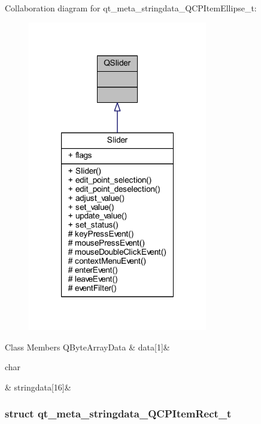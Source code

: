 Collaboration diagram for qt\+\_\+meta\+\_\+stringdata\+\_\+\+Q\+C\+P\+Item\+Ellipse\+\_\+t\+:
\nopagebreak
\begin{figure}[H]
\begin{center}
\leavevmode
\includegraphics[width=222pt]{d9/d0d/a00298}
\end{center}
\end{figure}
\begin{DoxyFields}{Class Members}
\hypertarget{a00067_a7efd0687e2b0fbd2c4df25855b74af30}{Q\+Byte\+Array\+Data}\label{a00067_a7efd0687e2b0fbd2c4df25855b74af30}
&
data\mbox{[}1\mbox{]}&
\\
\hline

\hypertarget{a00067_a35ee014e43cf9f75fa027534df3b222d}{char}\label{a00067_a35ee014e43cf9f75fa027534df3b222d}
&
stringdata\mbox{[}16\mbox{]}&
\\
\hline

\end{DoxyFields}
\label{de/d79/a00203}
\hypertarget{a00067_de/d79/a00203}{}
\subsubsection{struct qt\+\_\+meta\+\_\+stringdata\+\_\+\+Q\+C\+P\+Item\+Rect\+\_\+t}



